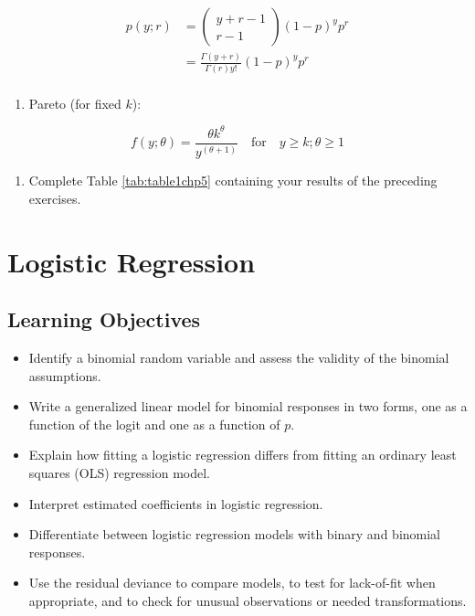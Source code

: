\documentclass[
]{krantz}
\providecommand{\tightlist}{%
  \setlength{\itemsep}{0pt}\setlength{\parskip}{0pt}}
\begin{document}
\begin{align}
p(y; r) & =  \left(\begin{array} {c}  y+r-1\\r-1  \end{array}\right)(1-p)^{y}p^r \nonumber \\
 & =  \frac{\Gamma(y+r)}{\Gamma(r)y!} (1-p)^{y}p^r  \\
\end{align}

\begin{enumerate}
\def\labelenumi{\alph{enumi})}
\setcounter{enumi}{9}
\tightlist
\item
  Pareto (for fixed \(k\)):
\end{enumerate}

\[f(y; \theta)=\frac{\theta k^\theta}{y^{(\theta+1)}}\quad \textrm{for}\quad y\geq k; \theta \geq 1\]

\begin{enumerate}
\def\labelenumi{\arabic{enumi}.}
\setcounter{enumi}{1}
\tightlist
\item
  Complete Table \ref{tab:table1chp5} containing your results of the preceding exercises.
\end{enumerate}

\hypertarget{ch-logreg}{%
\chapter{Logistic Regression}\label{ch-logreg}}

\hypertarget{learning-objectives-5}{%
\section{Learning Objectives}\label{learning-objectives-5}}

\begin{itemize}
\tightlist
\item
  Identify a binomial random variable and assess the validity of the binomial assumptions.
\item
  Write a generalized linear model for binomial responses in two forms, one as a function of the logit and one as a function of \(p\).
\item
  Explain how fitting a logistic regression differs from fitting an ordinary least squares (OLS) regression model.
\item
  Interpret estimated coefficients in logistic regression.
\item
  Differentiate between logistic regression models with binary and binomial responses.
\item
  Use the residual deviance to compare models, to test for lack-of-fit when appropriate, and to check for unusual observations or needed transformations.
\end{itemize}
\end{document}
